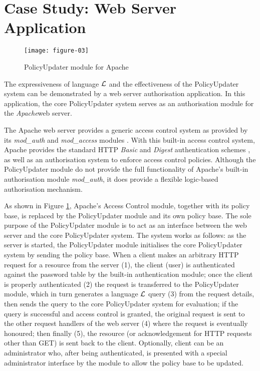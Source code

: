 \documentclass[glov2,twocolumn,final]{svjour2}
\begin{document}
  \section{Case Study: Web Server Application}
    \label{sec-case}

    \begin{figure}[ht]
      \begin{center}
        \texttt{[image: figure-03]}
        \caption{PolicyUpdater module for Apache}
        \label{fig-3}
      \end{center}
    \end{figure}

    The expressiveness of language $\cal{L}$ and the effectiveness of the
    PolicyUpdater system can be demonstrated by a web server authorisation
    application. In this application, the core PolicyUpdater system serves as
    an authorisation module for the {\em Apache}\footnotemark web server.


    The Apache web server provides a generic access control system as provided
    by its {\em mod\_auth} and {\em mod\_access} modules \cite{AP,LAU}. With
    this built-in access control system, Apache provides the standard HTTP
    {\em Basic} and {\em Digest} authentication schemes \cite{HTTP2}, as well
    as an authorisation system to enforce access control policies. Although the
    PolicyUpdater module do not provide the full functionality of Apache's
    built-in authorisation module {\em mod\_auth}, it does provide a flexible
    logic-based authorisation mechanism.

    As shown in Figure \ref{fig-3}, Apache's Access Control module, together
    with its policy base, is replaced by the PolicyUpdater module and its own
    policy base. The sole purpose of the PolicyUpdater module is to act as an
    interface between the web server and the core PolicyUpdater system. The
    system works as follows: as the server is started, the PolicyUpdater
    module initialises the core PolicyUpdater system by sending the policy
    base. When a client makes an arbitrary HTTP request for a resource from
    the server (1), the client (user) is authenticated against the password
    table by the built-in authentication module; once the client is properly
    authenticated (2) the request is transferred to the PolicyUpdater module,
    which in turn generates a language ${\cal L}$ query (3) from the request
    details, then sends the query to the core PolicyUpdater system for
    evaluation; if the query is successful and access control is granted,
    the original request is sent to the other request handlers of the web
    server (4) where the request is eventually honoured; then finally (5),
    the resource (or acknowledgement for HTTP requests other than GET) is sent
    back to the client. Optionally, client can be an administrator who,
    after being authenticated, is presented with a special administrator
    interface by the module to allow the policy base to be updated.
\end{document}
